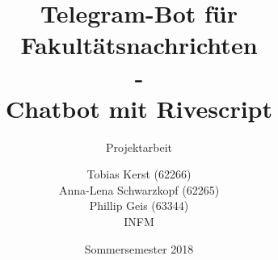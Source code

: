 \title{Telegram-Bot für Fakultätsnachrichten \\ - \\ Chatbot mit Rivescript}
\subtitle{Projektarbeit}
\author{%
	Tobias Kerst (62266) \\
  Anna-Lena Schwarzkopf (62265) \\
  Phillip Geis (63344) \\
  INFM
}
\date{Sommersemester 2018}
\publishers{
    \textbf{Professor:} Prof. Dr. rer. nat. Peter A. Henning
}
\maketitle

\clearpage
